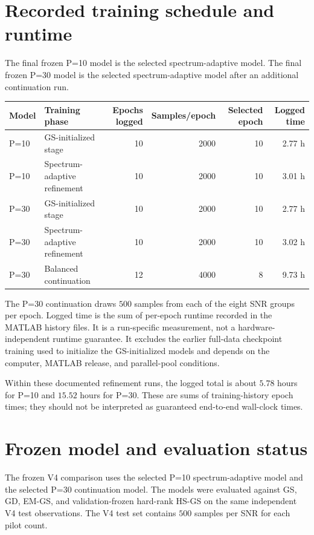 ﻿\documentclass[11pt,a4paper]{article}
\begin{document}
\section{Recorded training schedule and runtime}

The final frozen P=10 model is the selected spectrum-adaptive model. The
final frozen P=30 model is the selected spectrum-adaptive model after an
additional continuation run.

\begin{center}
\begin{tabular}{llrrrr}
\toprule
Model & Training phase & Epochs logged & Samples/epoch
& Selected epoch & Logged time \\
\midrule
P=10 & GS-initialized stage & 10 & 2000 & 10 & 2.77 h\\
P=10 & Spectrum-adaptive refinement & 10 & 2000 & 10 & 3.01 h\\
P=30 & GS-initialized stage & 10 & 2000 & 10 & 2.77 h\\
P=30 & Spectrum-adaptive refinement & 10 & 2000 & 10 & 3.02 h\\
P=30 & Balanced continuation & 12 & 4000 & 8 & 9.73 h\\
\bottomrule
\end{tabular}
\end{center}

The P=30 continuation draws \(500\) samples from each of the eight SNR
groups per epoch. Logged time is the sum of per-epoch runtime recorded in
the MATLAB history files. It is a run-specific measurement, not a
hardware-independent runtime guarantee. It excludes the earlier full-data
checkpoint training used to initialize the GS-initialized models and
depends on the computer, MATLAB release, and parallel-pool conditions.

Within these documented refinement runs, the logged total is about
\(5.78\) hours for P=10 and \(15.52\) hours for P=30. These are sums of
training-history epoch times; they should not be interpreted as guaranteed
end-to-end wall-clock times.

\section{Frozen model and evaluation status}

The frozen V4 comparison uses the selected P=10 spectrum-adaptive model
and the selected P=30 continuation model. The models were evaluated
against GS, GD, EM-GS, and validation-frozen hard-rank HS-GS on the same
independent V4 test observations. The V4 test set contains \(500\)
samples per SNR for each pilot count.
\end{document}
